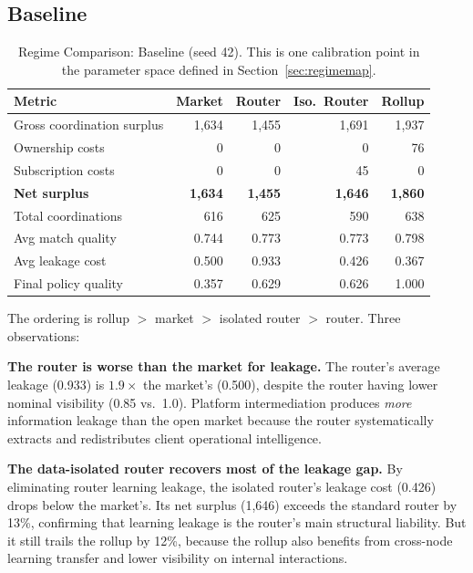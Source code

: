 \documentclass[12pt]{article}
\theoremstyle{definition}
\begin{document}
\subsection{Baseline}
\label{sec:baseline}

\begin{table}[H]
\centering
\caption{Regime Comparison: Baseline (seed 42). This is one calibration point in the parameter space defined in Section~\ref{sec:regimemap}.}
\label{tab:baseline}
\begin{tabular}{lrrrr}
\toprule
Metric & Market & Router & Iso.\ Router & Rollup \\
\midrule
Gross coordination surplus & 1,634 & 1,455 & 1,691 & 1,937 \\
Ownership costs & 0 & 0 & 0 & 76 \\
Subscription costs & 0 & 0 & 45 & 0 \\
\textbf{Net surplus} & \textbf{1,634} & \textbf{1,455} & \textbf{1,646} & \textbf{1,860} \\
Total coordinations & 616 & 625 & 590 & 638 \\
Avg match quality & 0.744 & 0.773 & 0.773 & 0.798 \\
Avg leakage cost & 0.500 & 0.933 & 0.426 & 0.367 \\
Final policy quality & 0.357 & 0.629 & 0.626 & 1.000 \\
\bottomrule
\end{tabular}
\end{table}

The ordering is rollup $>$ market $>$ isolated router $>$ router. Three observations:

\textbf{The router is worse than the market for leakage.} The router's average leakage (0.933) is $1.9\times$ the market's (0.500), despite the router having lower nominal visibility (0.85 vs.\ 1.0). Platform intermediation produces \textit{more} information leakage than the open market because the router systematically extracts and redistributes client operational intelligence.

\textbf{The data-isolated router recovers most of the leakage gap.} By eliminating router learning leakage, the isolated router's leakage cost (0.426) drops below the market's. Its net surplus (1,646) exceeds the standard router by 13\%, confirming that learning leakage is the router's main structural liability. But it still trails the rollup by 12\%, because the rollup also benefits from cross-node learning transfer and lower visibility on internal interactions.
\end{document}

